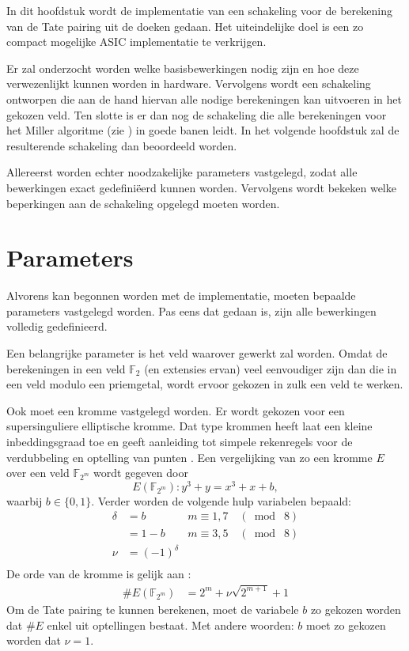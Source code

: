 
In dit hoofdstuk wordt de implementatie van een schakeling voor de berekening van de Tate pairing uit de doeken gedaan. Het uiteindelijke doel is een zo compact mogelijke  ASIC implementatie te verkrijgen.

Er zal onderzocht worden welke basisbewerkingen nodig zijn en hoe deze verwezenlijkt kunnen worden in hardware. Vervolgens wordt een schakeling ontworpen die aan de hand hiervan alle nodige berekeningen kan uitvoeren in het gekozen veld. Ten slotte is er dan nog de schakeling die alle berekeningen voor het Miller algoritme (zie ) in goede banen leidt. In het volgende hoofdstuk zal de resulterende schakeling dan beoordeeld worden.

Allereerst worden echter noodzakelijke parameters vastgelegd, zodat alle bewerkingen exact gedefini\"eerd kunnen worden. Vervolgens wordt bekeken welke beperkingen aan de schakeling opgelegd moeten worden.

\section{Parameters\label{sectie-implementatie-parameters}}

Alvorens kan begonnen worden met de implementatie, moeten bepaalde parameters vastgelegd worden. Pas eens dat gedaan is, zijn alle bewerkingen volledig gedefinieerd.

Een belangrijke parameter is het veld waarover gewerkt zal worden. Omdat de berekeningen in een veld $\mathbb{F}_2$ (en extensies ervan) veel eenvoudiger zijn dan die in een veld modulo een priemgetal, wordt ervoor gekozen in zulk een veld te werken.

Ook moet een kromme vastgelegd worden. Er wordt gekozen voor een supersinguliere elliptische kromme. Dat type krommen heeft laat een kleine inbeddingsgraad toe en geeft aanleiding tot simpele rekenregels voor de verdubbeling en optelling van punten \cite{maas, hankerson-book}. Een vergelijking van zo een kromme $E$ over een veld $\mathbb{F}_{2^m}$ wordt gegeven door
\[E(\mathbb{F}_{2^m}): y^3 + y = x^3 + x + b,\]
waarbij $b \in \{0, 1\}$. Verder worden de volgende hulp variabelen bepaald:
\[\begin{aligned}
\delta	&= b	\qquad	& m \equiv 1, 7 \quad(\bmod \; 8)\\
			&= 1 - b		& m \equiv 3, 5 \quad(\bmod \; 8)\\
\nu		&= (-1)^{\delta}\\
\end{aligned}\]
De orde van de kromme is gelijk aan \cite{bertoni, beuchat}:
\[\begin{aligned}
\#E(\mathbb{F}_{2^m})	&= 2^m + \nu \sqrt{2^{m + 1}} + 1
\end{aligned}\]
Om de Tate pairing te kunnen berekenen, moet de variabele $b$ zo gekozen worden dat $\#E$ enkel uit optellingen bestaat. Met andere woorden: $b$ moet zo gekozen worden dat $\nu = 1$.

